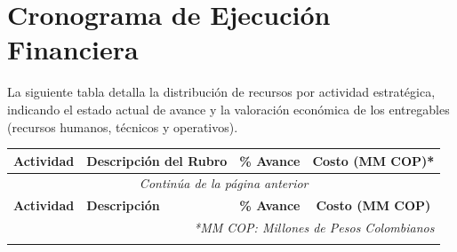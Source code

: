 \section{Cronograma de Ejecución Financiera}

La siguiente tabla detalla la distribución de recursos por actividad estratégica, indicando el estado actual de avance y la valoración económica de los entregables (recursos humanos, técnicos y operativos).

\begin{longtable}{|p{5cm}|p{6cm}|c|c|}
    \hline
    \textbf{Actividad} & \textbf{Descripción del Rubro} & \textbf{\% Avance} & \textbf{Costo (MM COP)*} \\
    \hline
    \endfirsthead
    \multicolumn{4}{c}{\textit{Continúa de la página anterior}} \\
    \hline
    \textbf{Actividad} & \textbf{Descripción} & \textbf{\% Avance} & \textbf{Costo (MM COP)} \\
    \hline
    \endhead
    \hline
    \multicolumn{4}{r}{\textit{*MM COP: Millones de Pesos Colombianos}} \\
    \endfoot
    \hline
    \endlastfoot
    

\end{longtable}
